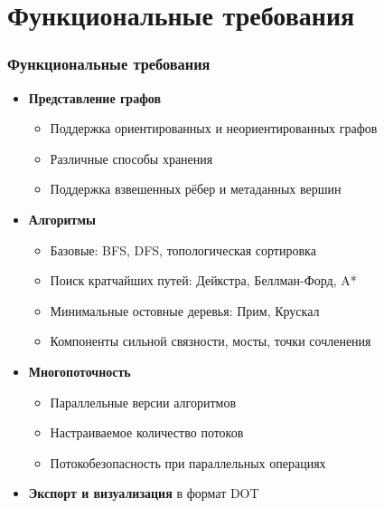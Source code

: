 \documentclass[aspectratio=169]{beamer}
\begin{document}
\section{Функциональные требования}
\begin{frame}
  \frametitle{Функциональные требования}
  \begin{itemize}
    \item \textbf{Представление графов} 
      \begin{itemize}
        \item Поддержка ориентированных и неориентированных графов
        \item Различные способы хранения 
        \item Поддержка взвешенных рёбер и метаданных вершин
      \end{itemize}
    \item \textbf{Алгоритмы}
      \begin{itemize}
        \item Базовые: BFS, DFS, топологическая сортировка
        \item Поиск кратчайших путей: Дейкстра, Беллман-Форд, A*
        \item Минимальные остовные деревья: Прим, Крускал
        \item Компоненты сильной связности, мосты, точки сочленения
      \end{itemize}
    \item \textbf{Многопоточность}
      \begin{itemize}
        \item Параллельные версии алгоритмов
        \item Настраиваемое количество потоков
        \item Потокобезопасность при параллельных операциях
      \end{itemize}
    \item \textbf{Экспорт и визуализация} в формат DOT
  \end{itemize}
\end{frame}

\end{document}
